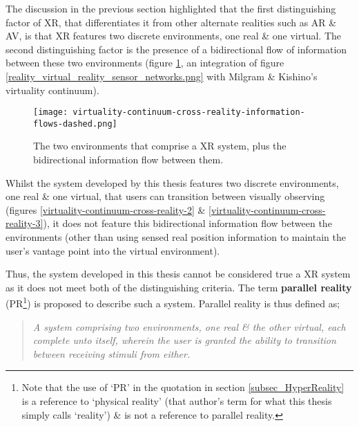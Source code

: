 \newcommand{\PRfootnote}{\footnote{Note that the use of `PR' in the quotation in section \ref{subsec_HyperReality} is a reference to `physical reality' (that author's term for what this thesis simply calls `reality') \& is not a reference to parallel reality.}}

The discussion in the previous section highlighted that the first distinguishing factor of XR, that differentiates it from other alternate realities such as AR \& AV, is that XR features two discrete environments, one real \& one virtual. The second distinguishing factor is the presence of a bidirectional flow of information between these two environments (figure \ref{virtuality-continuum-cross-reality-information-flows-dashed.png}, an integration of figure \ref{reality_virtual_reality_sensor_networks.png} with Milgram \& Kishino's virtuality continuum).

\begin{figure}[h]
	\begin{center}
		\texttt{[image: virtuality-continuum-cross-reality-information-flows-dashed.png]}
		\caption{The two environments that comprise a XR system, plus the bidirectional information flow between them.}
		\label{virtuality-continuum-cross-reality-information-flows-dashed.png}
	\end{center}
\end{figure}

Whilst the system developed by this thesis features two discrete environments, one real \& one virtual, that users can transition between visually observing (figures \ref{virtuality-continuum-cross-reality-2} \& \ref{virtuality-continuum-cross-reality-3}), it does not feature this bidirectional information flow between the environments (other than using sensed real position information to maintain the user's vantage point into the virtual environment).

Thus, the system developed in this thesis cannot be considered true a XR system as it does not meet both of the distinguishing criteria. The term \textbf{parallel reality} (PR\PRfootnote{}) is proposed to describe such a system. Parallel reality is thus defined as;

\begin{quote}
	\textit{A system comprising two environments, one real \& the other virtual, each complete unto itself, wherein the user is granted the ability to transition between receiving stimuli from either.}
\end{quote}

